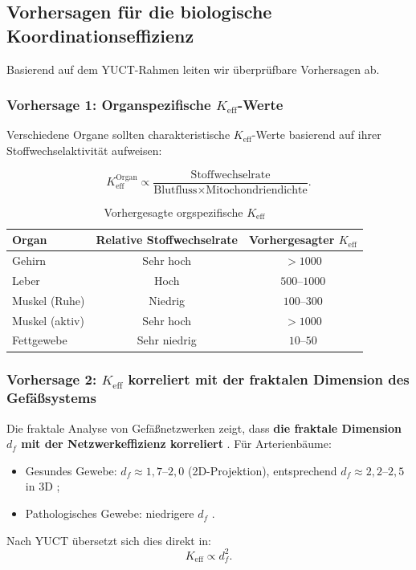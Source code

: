\documentclass[12pt]{article}
\newcommand{\Keff}{K_{\mathrm{eff}}}
\begin{document}
	\subsection{Vorhersagen für die biologische Koordinationseffizienz}
	
	Basierend auf dem YUCT-Rahmen leiten wir überprüfbare Vorhersagen ab.
	
	\subsubsection{Vorhersage 1: Organspezifische \(\Keff\)-Werte}
	
	Verschiedene Organe sollten charakteristische \(\Keff\)-Werte basierend auf ihrer Stoffwechselaktivität aufweisen:
	
	\begin{equation}
		\Keff^{\text{Organ}} \propto \frac{\text{Stoffwechselrate}}{\text{Blutfluss} \times \text{Mitochondriendichte}}.
	\end{equation}
	
	\begin{table}[htbp]
		\centering
		\caption{Vorhergesagte orgspezifische \(K_{\mathrm{eff}}\)}
		\label{tab:organ-keff}
		\begin{tabular}{lcc}
			\toprule
			\textbf{Organ} & \textbf{Relative Stoffwechselrate} & \textbf{Vorhergesagter \(K_{\mathrm{eff}}\)} \\
			\midrule
			Gehirn      & Sehr hoch   & \(>1000\) \\
			Leber       & Hoch        & \(500\)–\(1000\) \\
			Muskel (Ruhe) & Niedrig    & \(100\)–\(300\) \\
			Muskel (aktiv) & Sehr hoch & \(>1000\) \\
			Fettgewebe  & Sehr niedrig & \(10\)–\(50\) \\
			\bottomrule
		\end{tabular}
	\end{table}
	
	\subsubsection{Vorhersage 2: \(\Keff\) korreliert mit der fraktalen Dimension des Gefäßsystems}
	
	Die fraktale Analyse von Gefäßnetzwerken zeigt, dass \textbf{die fraktale Dimension \(d_f\) mit der Netzwerkeffizienz korreliert} \cite{Gould1993}. Für Arterienbäume:
	\begin{itemize}
		\item Gesundes Gewebe: \(d_f \approx 1,7\)–\(2,0\) (2D-Projektion), entsprechend \(d_f \approx 2,2\)–\(2,5\) in 3D \cite{Cross1993};
		\item Pathologisches Gewebe: niedrigere \(d_f\) \cite{Gould1993}.
	\end{itemize}
	Nach YUCT übersetzt sich dies direkt in:
	\begin{equation}
		\Keff \propto d_f^{2}.
	\end{equation}
	
\end{document}
